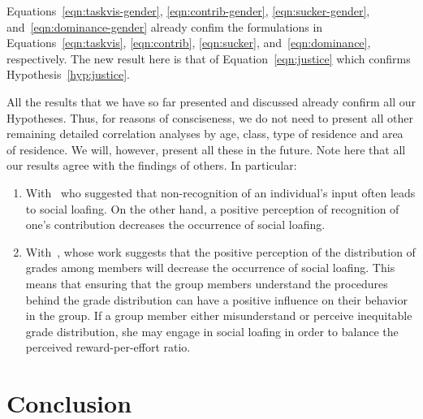 \documentclass[a4paper,a4paper,BCOR12mm,12pt,abstracton,pointednumbers,tablecaptionabove,footinclude,halfparskip,normalheadings,]{scrartcl}
\begin{document}
Equations~\ref{eqn:taskvis-gender}, \ref{eqn:contrib-gender}, \ref{eqn:sucker-gender}, and~\ref{eqn:dominance-gender} already confim the formulations in Equations~\ref{eqn:taskvis}, \ref{eqn:contrib}, \ref{eqn:sucker}, and~\ref{eqn:dominance}, respectively. The new result here is that of Equation~\ref{eqn:justice} which confirms Hypothesis~\ref{hyp:justice}.

All the results that we have so far presented and discussed already confirm all our Hypotheses. Thus, for reasons of consciseness, we do not need to present all other remaining detailed correlation analyses by age, class, type of residence and area of residence. We will, however, present all these in the future. Note here that all our results agree with the findings of others. In particular:
\begin{enumerate}
\item With~\citet{Liden04} who suggested that non-recognition of an individual's input often leads to social loafing. On the other hand, a positive perception of recognition of one's contribution decreases the occurrence of social loafing. 
\item With~\citet{Liden04}, whose work suggests that the positive perception of the distribution of grades among members will decrease the occurrence of social loafing. This means that ensuring that the group members understand the procedures behind the grade distribution can have a positive influence on their behavior in the group. If a group member either misunderstand or perceive inequitable grade distribution, she may engage in social loafing in order to balance the perceived reward-per-effort ratio. 
\end{enumerate}

\section{Conclusion}\label{sec:conclude}
\end{document}
